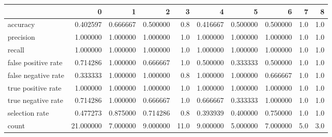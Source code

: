 \begin{tabular}{lrrrrrrrrr}
\toprule
{} &          0 &         1 &         2 &     3 &         4 &         5 &         6 &    7 &    8 \\
\midrule
accuracy            &   0.402597 &  0.666667 &  0.500000 &   0.8 &  0.416667 &  0.500000 &  0.500000 &  1.0 &  1.0 \\
precision           &   1.000000 &  1.000000 &  1.000000 &   1.0 &  1.000000 &  1.000000 &  1.000000 &  1.0 &  1.0 \\
recall              &   1.000000 &  1.000000 &  1.000000 &   1.0 &  1.000000 &  1.000000 &  1.000000 &  1.0 &  1.0 \\
false positive rate &   0.714286 &  1.000000 &  0.666667 &   1.0 &  0.500000 &  0.333333 &  0.500000 &  1.0 &  1.0 \\
false negative rate &   0.333333 &  1.000000 &  1.000000 &   0.8 &  1.000000 &  1.000000 &  0.666667 &  1.0 &  1.0 \\
true positive rate  &   1.000000 &  1.000000 &  1.000000 &   1.0 &  1.000000 &  1.000000 &  1.000000 &  1.0 &  1.0 \\
true negative rate  &   0.714286 &  1.000000 &  0.666667 &   1.0 &  0.666667 &  0.333333 &  1.000000 &  1.0 &  1.0 \\
selection rate      &   0.477273 &  0.875000 &  0.714286 &   0.8 &  0.393939 &  0.400000 &  0.750000 &  1.0 &  1.0 \\
count               &  21.000000 &  7.000000 &  9.000000 &  11.0 &  9.000000 &  5.000000 &  7.000000 &  5.0 &  3.0 \\
\bottomrule
\end{tabular}
